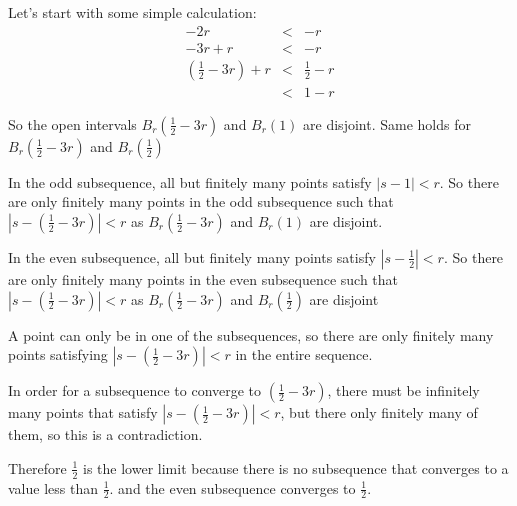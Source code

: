 Let's start with some simple calculation:
\begin{eqnarray*}
                                -2r &<& -r              \\
                            -3r + r &<& -r              \\
  \left(\frac{1}{2} - 3r\right) + r &<& \frac{1}{2} - r \\
                                    &<& 1 - r
\end{eqnarray*}

So the open intervals $ B_{r}\left(\frac{1}{2} - 3r\right) $ and $ B_{r}(1) $ are disjoint. Same holds for $ B_{r}\left(\frac{1}{2} - 3r\right) $ and $ B_{r}(\frac{1}{2}) $

In the odd subsequence, all but finitely many points satisfy $ | s - 1 | < r $. So there are only finitely many points in the odd subsequence
such that $ | s - \left(\frac{1}{2} - 3r\right) | < r $ as $ B_{r}\left(\frac{1}{2} - 3r\right) $ and $ B_{r}(1) $ are disjoint.

In the even subsequence, all but finitely many points satisfy $ | s - \frac{1}{2} | < r $. So there are only finitely many points in the even subsequence
such that $ | s - \left(\frac{1}{2} - 3r\right) | < r $ as $ B_{r}\left(\frac{1}{2} - 3r\right) $ and $ B_{r}(\frac{1}{2}) $ are disjoint

A point can only be in one of the subsequences, so there are only finitely many points satisfying $ | s - \left(\frac{1}{2} - 3r\right) | < r $ in the entire sequence.

In order for a subsequence to converge to $ \left(\frac{1}{2} - 3r\right) $, there must be infinitely many points that satisfy $ | s - \left(\frac{1}{2} - 3r\right) | < r $, but there only finitely many of them, so this is a contradiction.

Therefore $\frac{1}{2}$ is the lower limit because there is no subsequence that converges to a value less than $\frac{1}{2}$. and the even subsequence converges to $\frac{1}{2}$.